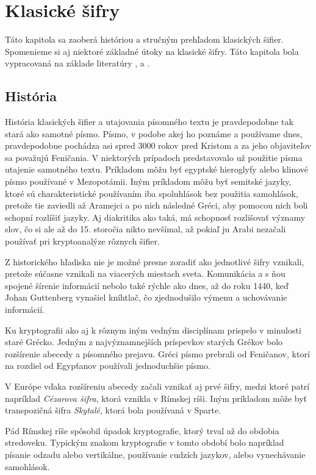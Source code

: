 \section{Klasické šifry}
Táto kapitola sa zaoberá históriou a stručným prehľadom klasických šifier.
Spomenieme si aj niektoré základné útoky na klasické šifry.
Táto kapitola bola vypracovaná na základe literatúry \cite{ks}, \cite{ev} a \cite{pea}.

\subsection{História}
História klasických šifier a utajovania písomného textu je pravdepodobne tak stará ako samotné písmo.
Písmo, v podobe akej ho poznáme a používame dnes, pravdepodobne pochádza asi spred 3000 rokov pred Kristom a za jeho objaviteľov sa považujú
Feničania.
V niektorých prípadoch predstavovalo už použitie písma utajenie samotného textu.
Príkladom môžu byť egyptské hieroglyfy alebo klinové písmo používané v Mezopotámii.
Iným príkladom môžu byť semitské jazyky, ktoré sú charakteristické používaním iba spoluhlások bez použitia samohlások,
pretože tie zaviedli až Aramejci a po nich následné Gréci, aby pomocou nich boli schopní rozlíšiť jazyky.
Aj diakritika ako taká, má schopnosť rozlišovať významy slov, čo si ale až do 15. storočia nikto nevšímal,
až pokiaľ ju Arabi nezačali používať pri kryptoanalýze rôznych šifier.

Z historického hľadiska nie je možné presne zoradiť ako jednotlivé šifry vznikali, pretože súčasne vznikali na viacerých miestach sveta.
Komunikácia a s ňou spojené šírenie informácií nebolo také rýchle ako dnes, až do roku 1440, keď Johan Guttenberg vynašiel kníhtlač,
čo zjednodušilo výmenu a uchovávanie informácií.

Ku kryptografii ako aj k rôznym iným vedným disciplínam prispelo v minulosti staré Grécko.
Jedným z najvýznamnejších príspevkov starých Grékov bolo rozšírenie abecedy a písomného prejavu.
Gréci písmo prebrali od Feničanov, ktorí na rozdiel od Egypťanov používali jednoduchšie písmo.

V Európe vďaka rozšíreniu abecedy začali vznikať aj prvé šifry, medzi ktoré patrí napríklad \textit{Cézarova šifra}, ktorá vznikla v Rímskej ríši.
Iným príkladom môže byť transpozičná šifra \textit{Skytalé}, ktorá bola používaná v Sparte.

Pád Rímskej ríše spôsobil úpadok kryptografie, ktorý trval až do obdobia stredoveku. Typickým znakom kryptografie v tomto období bolo
napríklad písanie odzadu alebo vertikálne, používanie cudzích jazykov, alebo vynechávanie samohlások.

